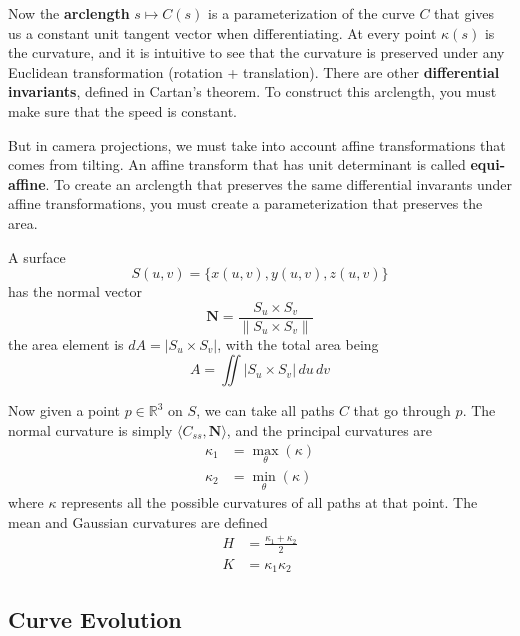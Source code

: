 \documentclass{article}
\begin{document}
    Now the \textbf{arclength} $s \mapsto C(s)$ is a parameterization of the curve $C$ that gives us a constant unit tangent vector when differentiating. At every point $\kappa(s)$ is the curvature, and it is intuitive to see that the curvature is preserved under any Euclidean transformation (rotation + translation). There are other \textbf{differential invariants}, defined in Cartan's theorem. To construct this arclength, you must make sure that the speed is constant. 

    But in camera projections, we must take into account affine transformations that comes from tilting. An affine transform that has unit determinant is called \textbf{equi-affine}. To create an arclength that preserves the same differential invarants under affine transformations, you must create a parameterization that preserves the area. 


    \begin{definition}[Surface]
      \label{def:surface}
    A surface 
    \begin{equation}
      S(u, v) = \{x(u, v), y(u, v), z(u, v)\}
    \end{equation}
    has the normal vector 
    \begin{equation}
      \mathbf{N} = \frac{S_u \times S_v}{\|S_u \times S_v\|}
    \end{equation}
    the area element is $dA = |S_u \times S_v|$, with the total area being 
    \begin{equation}
      A = \iint |S_u \times S_v| \, du\,dv
    \end{equation}
    \end{definition}

    Now given a point $p \in \mathbb{R}^3$ on $S$, we can take all paths $C$ that go through $p$. The normal curvature is simply $\langle C_{ss} , \mathbf{N}\rangle$, and the principal curvatures are 
    \begin{align*}
        \kappa_1 & = \max_\theta (\kappa) \\
        \kappa_2 & = \min_\theta (\kappa) 
    \end{align*}
    where $\kappa$ represents all the possible curvatures of all paths at that point. The mean and Gaussian curvatures are defined 
    \begin{align*}
        H & = \frac{\kappa_1 + \kappa_2}{2} \\
        K & = \kappa_1 \kappa_2
    \end{align*}

  \subsection{Curve Evolution}
\end{document}
